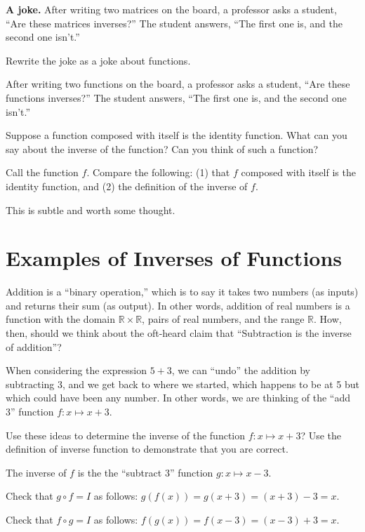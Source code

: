 \documentclass[space,handout,nooutcomes]{ximera}
\newcommand{\R}{\mathbb R}
\begin{document}
\textbf{A joke.}  After writing two matrices on the board, a professor asks a student, ``Are these matrices inverses?''  The student answers, ``The first one is, and the second one isn't.''  

\begin{question}
Rewrite the joke as a joke about functions.  
\begin{freeResponse}
\begin{hint}
After writing two functions on the board, a professor asks a student, ``Are these functions inverses?''  The student answers, ``The first one is, and the second one isn't.''  
\end{hint}
\end{freeResponse}
\end{question}

\begin{question}
Suppose a function composed with itself is the identity function.  What can you say about the inverse of the function?  Can you think of such a function?  
\begin{hint}
Call the function $f$.  Compare the following:  (1) that $f$ composed with itself is the identity function, and (2) the definition of the inverse of $f$.
\end{hint}
\begin{freeResponse}
\begin{hint}
This is subtle and worth some thought.  
\end{hint}
\end{freeResponse}
\end{question}

\section*{Examples of Inverses of Functions}
Addition is a ``binary operation,'' which is to say it takes two numbers (as inputs) and returns their sum (as output).  In other words, addition of real numbers is a function with the domain $\R\times \R$, pairs of real numbers, and the range $\R$.  How, then, 
should we think about the oft-heard claim that ``Subtraction is the inverse of addition''?  

When considering the expression $5+3$, we can ``undo'' the addition by subtracting 3, and we get back to where we started, which happens to be at 5 but which could have been any number.  In other words, we are thinking of the ``add 3'' function $f:x\mapsto x+3$.  
\begin{question}
Use these ideas to determine the inverse of the function $f:x\mapsto x+3$?  Use the definition of inverse function to demonstrate that you are correct.  
\begin{freeResponse}
\begin{hint}
The inverse of $f$ is the the ``subtract 3'' function $g:x\mapsto x-3$.  

Check that $g\circ f=I$ as follows:  $g(f(x))=g(x+3)=(x+3)-3=x$.  

Check that $f\circ g = I$ as follows:  $f(g(x))=f(x-3)=(x-3)+3=x$.  

\end{hint}
\end{freeResponse}
\end{question}
\end{document}
